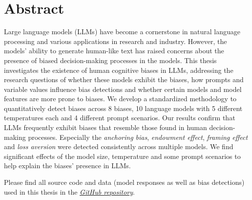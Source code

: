 \section*{Abstract}
\par Large language models (LLMs) have become a cornerstone in natural language processing and various applications in research and industry. However, the models' ability to generate human-like text has raised concerns about the presence of biased decision-making processes in the models. This thesis investigates the existence of human cognitive biases in LLMs, addressing the research questions of whether these models exhibit the biases, how prompts and variable values influence bias detections and whether certain models and model features are more prone to biases. We develop a standardized methodology to quantitatively detect biases across 8 biases, 10 language models with 5 different temperatures each and 4 different prompt scenarios. Our results confirm that LLMs frequently exhibit biases that resemble those found in human decision-making processes. Especially the \textit{anchoring bias}, \textit{endowment effect}, \textit{framing effect} and \textit{loss aversion} were detected consistently across multiple models. We find significant effects of the model size, temperature and some prompt scenarios to help explain the biases' presence in LLMs.

\vfill
\begin{flushbottom}
\par Please find all source code and data (model responses as well as bias detections) used in this thesis in the 
\href{https://github.com/maxjmohr/MSc_04_Master_Thesis}{\textit{GitHub repository}}.
\end{flushbottom}
